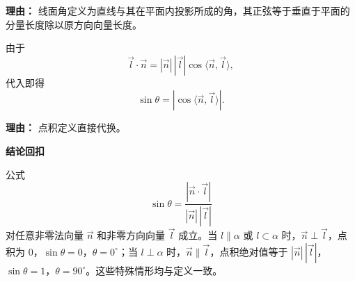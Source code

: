 \begin{proofbox}
\begin{description}[style=nextline, leftmargin=2.8em, labelsep=0.5em, itemsep=0.55em]
		      \par\textbf{理由：}
		      线面角定义为直线与其在平面内投影所成的角，其正弦等于垂直于平面的分量长度除以原方向向量长度。

		\item[\textbf{步骤四（余弦形式）：}]
		      由于
		      \[
			      \vec{l}\cdot\vec{n} = |\vec{n}|\,|\vec{l}|\cos\langle\vec{n},\vec{l}\rangle,
		      \]
		      代入即得
		      \[
			      \sin\theta = |\cos\langle\vec{n},\vec{l}\rangle|.
		      \]

		      \par\textbf{理由：}
		      点积定义直接代换。
	\end{description}

	\medskip

	\textbf{\textcolor{CProof}{结论回扣}}

	公式
	\[
		\sin\theta = \frac{|\vec{n}\cdot\vec{l}|}{|\vec{n}|\,|\vec{l}|}
	\]
	对任意非零法向量 $\vec{n}$ 和非零方向向量 $\vec{l}$ 成立。当 $l\parallel\alpha$ 或 $l\subset\alpha$ 时，$\vec{n}\perp\vec{l}$，点积为 $0$，$\sin\theta=0$，$\theta=0^\circ$；当 $l\perp\alpha$ 时，$\vec{n}\parallel\vec{l}$，点积绝对值等于 $|\vec{n}|\,|\vec{l}|$，$\sin\theta=1$，$\theta=90^\circ$。这些特殊情形均与定义一致。

\end{proofbox}